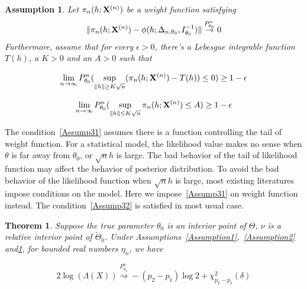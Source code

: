 \documentclass[3p]{elsarticle}
\theoremstyle{plain}
\newtheorem{theorem}{\quad\quad Theorem}
\newtheorem{assumption}{\quad\quad Assumption}
\theoremstyle{definition}
\theoremstyle{remark}
\begin{document}
\begin{assumption}\label{Assumption3}
    Let $\pi_n(h;\mathbf{X}^{(n)})$ be a weight function satisfying 
        \begin{equation}\label{vonMisesResults}
            \|\pi_n(h;\mathbf{X}^{(n)})-\phi(h;\Delta_{n,\theta_0},I_{\theta_0}^{-1})\|\overset{P_{\theta_0}^n}{\to}0
        \end{equation}
Furthermore, assume that for every $\epsilon>0$, there's a Lebesgue integrable function $T(h)$, a $K>0$ and an $A>0$ such that 

    \begin{equation}\label{Assump31}
        \lim_{n\to \infty}P_{\theta_0}^n(\sup_{\|h\|\geq K\sqrt{n}}(\pi_n(h;\mathbf{X}^{(n)})-T(h))\leq 0)\geq 1-\epsilon
\end{equation}

        \begin{equation}\label{Assump32}
            \lim_{n\to \infty} P_{\theta_0}^n(\sup_{\|h\|\leq K\sqrt{n}} \pi_n(h;\mathbf{X}^{(n)})\leq A)\geq 1-\epsilon
        \end{equation}
\end{assumption}


The condition~\ref{Assump31} assumes there is a function controlling the tail of weight function. For a statistical model, the likelihood value makes no sense when $\theta$ is far away from $\theta_0$, or $\sqrt{n}h$ is large.
The bad behavior of the tail of likelihood function may affect the behavior of posterior distribution.
To avoid the bad behavior of the likelihood function when $\sqrt{n}h$ is large, most existing literatures impose conditions on the model.
Here we impose~\ref{Assump31} on weight function instead.
The condition~\ref{Assump32} is satisfied in most usual case.

\begin{theorem}\label{theoremMain}
    Suppose the true parameter $\theta_0$ is an interior point of $\Theta$, $\nu$ is a relative interior point of $\tilde{\Theta}_0$.
    Under Assumptions~\ref{Assumption1},~\ref{Assumption2} and\ref{Assumption3}, for bounded real numbers $\eta_n$, we have

    $$
    2\log(\Lambda(X))\overset{P_{{\eta_n}}^n}{\rightsquigarrow} -(p_2-p_1)\log 2+\chi^2_{p_2-p_1}(\delta)
    $$
\end{theorem}
\end{document}
